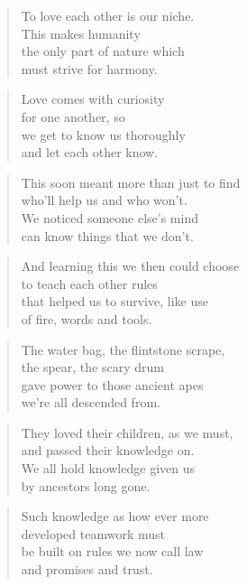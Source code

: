 \documentclass[14pt,a4paper]{article}
\begin{document}
\begin{verse}
To love each other is our niche.\\
This makes humanity\\
the only part of nature which\\
must strive for harmony.
\end{verse}

\begin{verse}
Love comes with curiosity\\
for one another, so\\
we get to know us thoroughly\\
and let each other know.
\end{verse}

\begin{verse}
This soon meant more than just to find\\
who’ll help us and who won’t.\\
We noticed someone else’s mind\\
can know things that we don’t.
\end{verse}

\begin{verse}
And learning this we then could choose\\
to teach each other rules\\
that helped us to survive, like use\\
of fire, words and tools.
\end{verse}

\begin{verse}
The water bag, the flintstone scrape,\\
the spear, the scary drum\\
gave power to those ancient apes\\
we’re all descended from.
\end{verse}

\begin{verse}
They loved their children, as we must,\\
and passed their knowledge on.\\
We all hold knowledge given us\\
by ancestors long gone.
\end{verse}

\begin{verse}
Such knowledge as how ever more\\
developed teamwork must\\
be built on rules we now call law\\
and promises and trust.
\end{verse}
\end{document}
